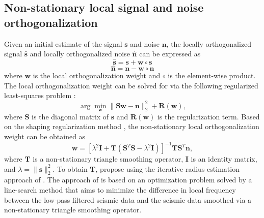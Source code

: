 \subsection{Non-stationary local signal and noise orthogonalization}
Given an initial estimate of the signal $\mathbf{s}$ and noise $\mathbf{n}$, the locally orthogonalized signal $\mathbf{\hat{s}}$ and locally orthogonalized noise $\mathbf{\hat{n}}$ can be expressed as
\begin{equation}
\mathbf{\hat{s}} = \mathbf{s} + \mathbf{w}\circ\mathbf{s}
\label{eq:orthosignal}
\end{equation}
\begin{equation}
\mathbf{\hat{n}} = \mathbf{n} - \mathbf{w}\circ\mathbf{n}
\label{eq:orthonoise}
\end{equation}
where $\mathbf{w}$ is the local orthogonalization weight \cite[]{chenfomel2015} and $\circ$ is the element-wise product. 
The local orthogonalization weight can be solved for via the following regularized least-squares problem \cite[]{chenfomelorthon2021}:
\begin{equation}
\arg \min_{\mathbf{w}} \parallel  \mathbf{S}\mathbf{w} - \mathbf{n} \parallel_2^2 + \mathbf{R}(\mathbf{w}),
\label{eq:weight}
\end{equation}
where $\mathbf{S}$ is the diagonal matrix of $\mathbf{{s}}$  and $\mathbf{R(w)}$ is the regularization term. 
Based on the shaping regularization method \cite[]{fomel2007b}, the non-stationary local orthogonalization weight can be obtained as 
\begin{equation}
\mathbf{w} = [\lambda^2 \mathbf{I} + \mathbf{T} (\mathbf{S}^T\mathbf{S} -\lambda^2 \mathbf{I})]^{-1}\mathbf{T}\mathbf{S}^T\mathbf{n},
\label{eq:weightsol}
\end{equation}
where $\mathbf{T}$ is a non-stationary triangle smoothing operator, $\mathbf{I}$ is an identity matrix, and $\lambda=\parallel\mathbf{s}\parallel^2_2$. 
To obtain $\mathbf{T}$, \cite{chenfomelorthon2021} propose using the iterative radius estimation approach of \cite{greerfomel2018}. 
The approach of \cite{greerfomel2018} is based on an optimization problem solved by a line-search method that aims to minimize the difference in local frequency between the low-pass filtered seismic data and the seismic data smoothed via a non-stationary triangle smoothing operator. 
